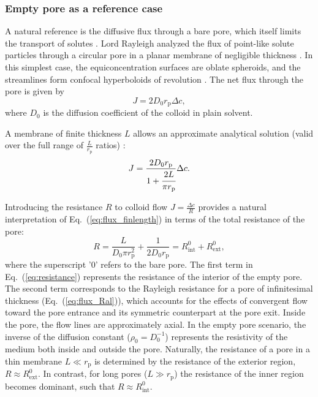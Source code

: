 \documentclass[12pt, a4paper]{article}
\begin{document}
\subsubsection{Empty pore as a reference case}

A natural reference is the diffusive flux through a bare pore, which itself limits the transport of solutes \cite{Deen1987, Sun2024}.
Lord Rayleigh analyzed the flux of point-like solute particles through a circular pore in a planar membrane of negligible thickness \cite{Strutt1878}.
In this simplest case, the equiconcentration surfaces are oblate spheroids, and the streamlines form confocal hyperboloids of revolution \cite{Cooke1966}.
The net flux through the pore is given by
\begin{equation}
    J=2D_0r_{\text{p}}\Delta c,
    \label{eq:flux_Ral}
\end{equation}
where $D_0$ is the diffusion coefficient of the colloid in plain solvent.

A membrane of finite thickness $L$ allows an approximate analytical solution (valid over the full range of $\frac{L}{r_{\text{p}}}$ ratios) \cite{Brunn1984}:
\begin{equation}
    J=\frac{2 D_0 r_{\text{p}}}{1+\cfrac{2L}{\pi r_{\text{p}}}}\Delta c.
    \label{eq:flux_finlength}
\end{equation}

Introducing the resistance $R$ to colloid flow $J = \frac{\Delta c}{R}$ provides a natural interpretation of Eq.~(\ref{eq:flux_finlength}) in terms of the total resistance of the pore:
\begin{equation}
    R = \frac{L}{D_0 \pi r_{\text{p}}^{2}} + \frac{1}{2 D_0 r_{\text{p}}} = R_{\text{int}}^{0} + R_{\text{ext}}^{0},
    \label{eq:resistance}
\end{equation}
where the superscript '0' refers to the bare pore.
The first term in Eq.~(\ref{eq:resistance}) represents the resistance of the interior of the empty pore.
The second term corresponds to the Rayleigh resistance for a pore of infinitesimal thickness (Eq.~(\ref{eq:flux_Ral})), which accounts for the effects of convergent flow toward the pore entrance and its symmetric counterpart at the pore exit.
Inside the pore, the flow lines are approximately axial.
In the empty pore scenario, the inverse of the diffusion constant ($\rho_0=D_0^{-1}$) represents the resistivity of the medium both inside and outside the pore.
Naturally,  the resistance of a pore in a thin membrane $L \ll r_{\text{p}}$ is determined by the resistance of the exterior region, $R \approx R_{\text{ext}}^{0}$.
In contrast, for long pores ($L \gg r_{\text{p}}$) the resistance of the inner region becomes dominant, such that $R \approx R_{\text{int}}^{0}$.
\end{document}
